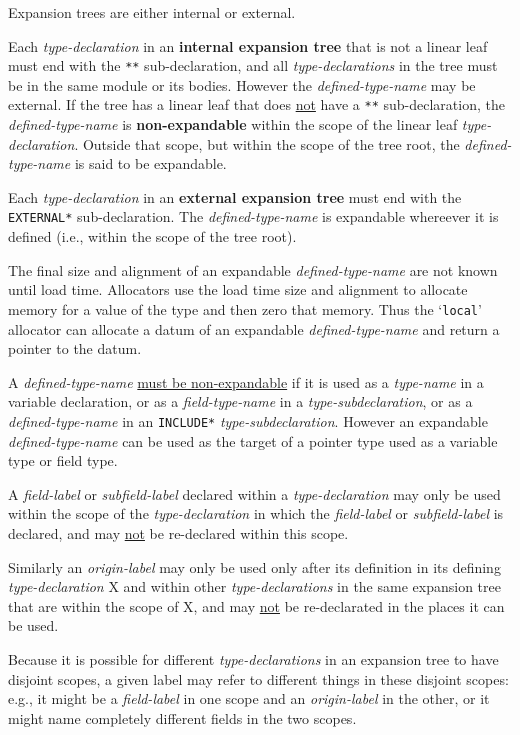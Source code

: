\documentclass[12pt]{article}
\newcommand{\key}[1]{{\rm \bfseries #1}}
\begin{document}
Expansion trees are either internal or external.

Each {\em type-declaration} in an \key{internal expansion tree}
that is not a linear leaf must end with
the {\tt ***}\label{***} sub-declaration, and all {\em type-declarations}
in the tree must be in the same module or its bodies.  However the
{\em defined-type-name} may be external.
If the tree has a linear leaf that does \underline{not}
have a {\tt ***} sub-declaration, the {\em defined-type-name}
is \key{non-expandable}
within the scope of the linear leaf {\em type-declaration}.
Outside that scope, but within the scope of the tree root,
the {\em defined-type-name} is said to be expandable.

Each {\em type-declaration} in an \key{external expansion tree}
must end with the {\tt *EXTERNAL*}\label{*EXTERNAL*} sub-declaration.
The {\em defined-type-name} is expandable whereever it is defined
(i.e., within the scope of the tree root).

The final size and alignment of an expandable {\em defined-type-name}
are not known until load time.
Allocators use the load time
size and alignment to allocate memory for a value of
the type and then zero that memory.  Thus the `{\tt local}' allocator 
can allocate a datum of an expandable {\em defined-type-name}
and return a pointer to the datum.

A {\em defined-type-name} \underline{must be non-expandable} if it is used as
a {\em type-name} in a variable declaration, or as a {\em field-type-name}
in a {\em type-subdeclaration}, or as a {\em defined-type-name} in an
{\tt *INCLUDE*} {\em type-subdeclaration}.  However an expandable
{\em defined-type-name}
can be used as the target of a pointer type used as a variable type or
field type.

A {\em field-label} or {\em subfield-label}
declared within a {\em type-declaration} may
only be used within the scope of the {\em type-declaration}
in which the {\em field-label} or {\em subfield-label} is declared,
and may \underline{not} be re-declared within this scope.

Similarly an {\em origin-label} may only be used only after its definition
in its defining {\em type-declaration} X
and within other {\em type-declarations}
in the same expansion tree that are within the scope of X, and
may \underline{not} be re-declarated in the places it can be used.

Because it is possible for different {\em type-declarations} in
an expansion tree to have disjoint scopes, a given label may refer
to different things in these disjoint scopes: e.g., it might be a
{\em field-label} in one scope and an {\em origin-label} in the
other, or it might name completely different fields in the two scopes.
\end{document}
